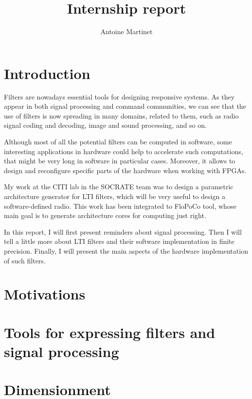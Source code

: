 \documentclass[twoside]{article}
\title{Internship report}
\author{Antoine Martinet}
\theoremstyle{remark}
\numberwithin{equation}{subsection}
\begin{document}
\maketitle
\newpage
\tableofcontents
\newpage

\section*{ Introduction }

	Filters are nowadays essential tools for designing responsive systems.
	As they appear in both signal processing and command communities,
	we can see that the use of filters is now spreading in many domains, related to them,
	such as radio signal coding and decoding, image and sound processing, and so on.


	Although most of all the potential filters can be computed in software,
	some interesting applications in hardware could help to accelerate such computations, 
	that might be very long in software in particular cases.
	Moreover, it allows to design and reconfigure specific parts of the hardware when working with FPGAs.

	
	My work at the CITI lab in the SOCRATE team was to design a parametric architecture generator for LTI filters, 
	which will be very useful to design a software-defined radio.
	This work has been integrated to FloPoCo tool,
	whose main goal is to generate architecture cores for computing just right.


	In this report, I will first present reminders about signal processing.
	Then I will tell a little more about LTI filters and their software implementation in finite precision.
	Finally, I will present the main aspects of the hardware implementation of such filters.

\section{Motivations}

\section{Tools for expressing filters and signal processing}


\newpage
\section{Dimensionment}

\end{document}

